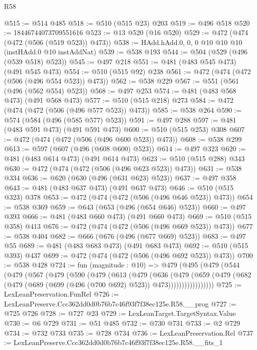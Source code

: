 \begin{lexlean}{R58}
\begin{coremodule}
@515 := @514 @485
@518 := @510 (@515 @23) @203
@519 := @496 @518
@520 := 18446744073709551616
@523 := @13 @520 (@16 @520)
@529 := @472 (@474 (@472 (@506 (@519 @523)) @473))
@538 := HAdd.hAdd.{0, 0, 0} @10 @10 @10 (instHAdd.{0} @10 instAddNat)
@539 := @538 @193
@544 := @504 (@529 (@496 (@539 @518) @523))
@545 := @497 @218
@551 := @481 (@483 @545 @473) (@491 @545 @473)
@554 := @510 (@515 @92) @238
@561 := @472 (@474 (@472 (@506 (@496 @554 @523)) @473))
@562 := @538 @229
@567 := @551 (@561 (@496 (@562 @554) @523))
@568 := @497 @253
@574 := @481 (@483 @568 @473) (@491 @568 @473)
@577 := @510 (@515 @218) @273
@584 := @472 (@474 (@472 (@506 (@496 @577 @523)) @473))
@585 := @538 @264
@590 := @574 (@584 (@496 (@585 @577) @523))
@591 := @497 @288
@597 := @481 (@483 @591 @473) (@491 @591 @473)
@600 := @510 (@515 @253) @308
@607 := @472 (@474 (@472 (@506 (@496 @600 @523)) @473))
@608 := @538 @299
@613 := @597 (@607 (@496 (@608 @600) @523))
@614 := @497 @323
@620 := @481 (@483 @614 @473) (@491 @614 @473)
@623 := @510 (@515 @288) @343
@630 := @472 (@474 (@472 (@506 (@496 @623 @523)) @473))
@631 := @538 @334
@636 := @620 (@630 (@496 (@631 @623) @523))
@637 := @497 @358
@643 := @481 (@483 @637 @473) (@491 @637 @473)
@646 := @510 (@515 @323) @378
@653 := @472 (@474 (@472 (@506 (@496 @646 @523)) @473))
@654 := @538 @369
@659 := @643 (@653 (@496 (@654 @646) @523))
@660 := @497 @393
@666 := @481 (@483 @660 @473) (@491 @660 @473)
@669 := @510 (@515 @358) @413
@676 := @472 (@474 (@472 (@506 (@496 @669 @523)) @473))
@677 := @538 @404
@682 := @666 (@676 (@496 (@677 @669) @523))
@683 := @497 @55
@689 := @481 (@483 @683 @473) (@491 @683 @473)
@692 := @510 (@515 @393) @437
@699 := @472 (@474 (@472 (@506 (@496 @692 @523)) @473))
@700 := @538 @428
@724 := fun (magnitude : @10) =>
  @479
    (@495
      (@479
        (@544
          (@479
            (@567
              (@479
                (@590
                  (@479
                    (@613
                      (@479
                        (@636
                          (@479
                            (@659
                              (@479
                                (@682
                                  (@479 (@689 (@699 (@496 (@700 @692) @523)) @473)))))))))))))))))
@725 := LexLeanPreservation.FunRel
@726 := LexLeanPreserve.Ccc362dd0d0b76b7c46f93f7f38ec125e.R58.__prog
@727 := @725 @726
@728 := @727 @23
@729 := LexLeanTarget.TargetSyntax.Value
@730 := @6 @729
@731 := @51 @485
@732 := @730 @731
@733 := @2 @729
@734 := @732 @733
@735 := @728 @734
@736 := LexLeanPreservation.Rel
@737 := LexLeanPreserve.Ccc362dd0d0b76b7c46f93f7f38ec125e.R58.__fits_1

\end{coremodule}
\end{lexlean}
